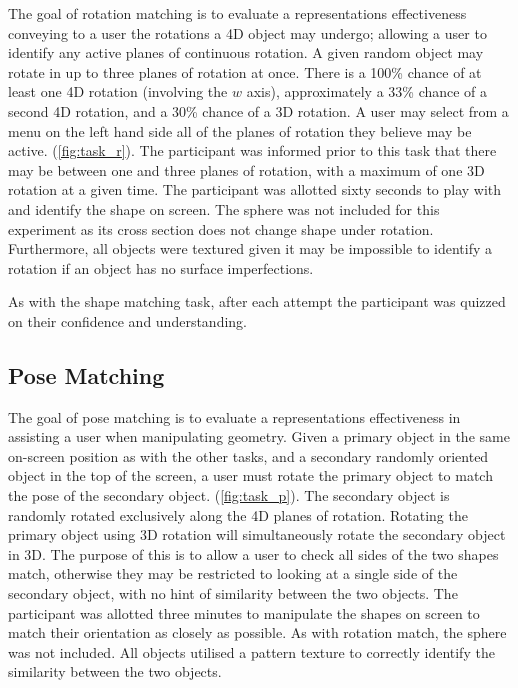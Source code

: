 \documentclass{l4proj}
\begin{document}
The goal of rotation matching is to evaluate a representations effectiveness conveying to a user the rotations a 4D object may undergo; allowing a user to identify any active planes of continuous rotation.
A given random object may rotate in up to three planes of rotation at once. There is a 100\% chance of at least one 4D rotation (involving the \(w\) axis), approximately a 33\% chance of a second 4D rotation, and a 30\% chance of a 3D rotation.
A user may select from a menu on the left hand side all of the planes of rotation they believe may be active. (\cref{fig:task_r}).
The participant was informed prior to this task that there may be between one and three planes of rotation, with a maximum of one 3D rotation at a given time.
The participant was allotted sixty seconds to play with and identify the shape on screen.
The sphere was not included for this experiment as its cross section does not change shape under rotation. 
Furthermore, all objects were textured given it may be impossible to identify a rotation if an object has no surface imperfections.

As with the shape matching task, after each attempt the participant was quizzed on their confidence and understanding.

\subsection{Pose Matching}

The goal of pose matching is to evaluate a representations effectiveness in assisting a user when manipulating geometry.
Given a primary object in the same on-screen position as with the other tasks, and a secondary randomly oriented object in the top of the screen, a user must rotate the primary object to match the pose of the secondary object. (\cref{fig:task_p}).
The secondary object is randomly rotated exclusively along the 4D planes of rotation. 
Rotating the primary object using 3D rotation will simultaneously rotate the secondary object in 3D. The purpose of this is to allow a user to check all sides of the two shapes match, otherwise they may be restricted to looking at a single side of the secondary object, with no hint of similarity between the two objects.
The participant was allotted three minutes to manipulate the shapes on screen to match their orientation as closely as possible.
As with rotation match, the sphere was not included. All objects utilised a pattern texture to correctly identify the similarity between the two objects.
\end{document}
